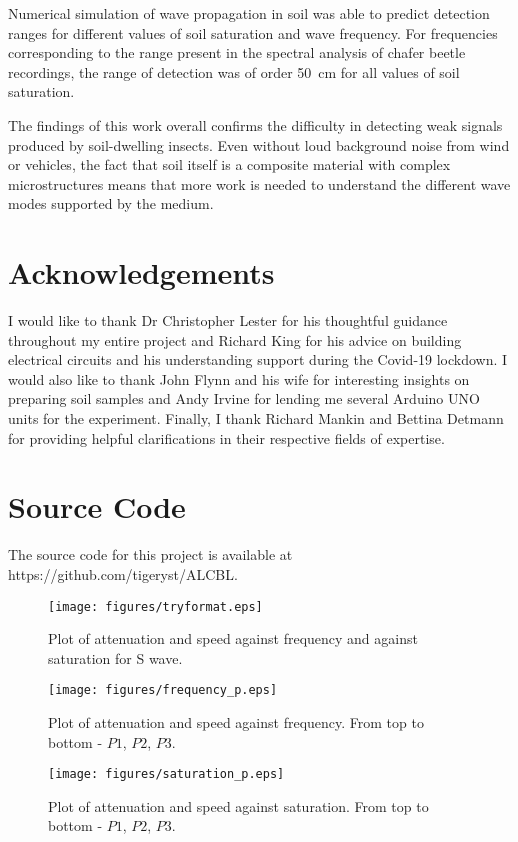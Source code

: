 \documentclass[twocolumn]{article}
\begin{document}
Numerical simulation of wave propagation in soil was able to predict detection ranges for different values of soil saturation and wave frequency. For frequencies corresponding to the range present in the spectral analysis of chafer beetle recordings, the range of detection was of order \SI{50}{\cm} for all values of soil saturation.

The findings of this work overall confirms the difficulty in detecting weak signals produced by soil-dwelling insects. Even without loud background noise from wind or vehicles, the fact that soil itself is a composite material with complex microstructures means that more work is needed to understand the different wave modes supported by the medium.

\section*{Acknowledgements}
I would like to thank Dr Christopher Lester for his thoughtful guidance throughout my entire project and Richard King for his advice on building electrical circuits and his understanding support during the Covid-19 lockdown. I would also like to thank John Flynn and his wife for interesting insights on preparing soil samples and Andy Irvine for lending me several Arduino UNO units for the experiment. Finally, I thank Richard Mankin and Bettina Detmann for providing helpful clarifications in their respective fields of expertise.

\section*{Source Code}
The source code for this project is available at https://github.com/tigeryst/ALCBL.

\begin{figure}
    \centering
    \onecolumn\texttt{[image: figures/tryformat.eps]}
    \caption{Plot of attenuation and speed against frequency and against saturation for S wave.}
    \label{fig:final_s}
\end{figure}
\twocolumn

\begin{figure}
    \centering
    \onecolumn\texttt{[image: figures/frequency\_p.eps]}
    \caption{Plot of attenuation and speed against frequency. From top to bottom - $P1$, $P2$, $P3$.}
    \label{fig:frequency_p}
\end{figure}
\twocolumn

\begin{figure}
    \centering
    \onecolumn\texttt{[image: figures/saturation\_p.eps]}
    \caption{Plot of attenuation and speed against saturation. From top to bottom - $P1$, $P2$, $P3$.}
    \label{fig:saturation_p}
\end{figure}
\twocolumn

\printbibliography


\end{document}
